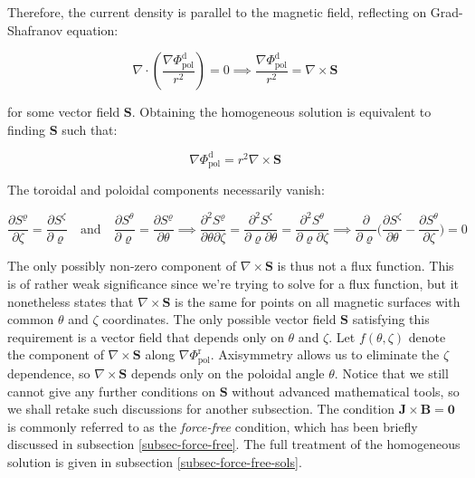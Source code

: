 Therefore, the current density is parallel to the magnetic field, reflecting on Grad-Shafranov equation:

\begin{equation}
    \nabla\cdot\left(\frac{\nabla\Phi_\text{pol}^\mathrm{d}}{r^2}\right)=0\implies\frac{\nabla\Phi_\text{pol}^\mathrm{d}}{r^2}=\nabla\times\mathbf{S}
\end{equation}

for some vector field $\mathbf{S}$. Obtaining the homogeneous solution is equivalent to finding $\mathbf{S}$ such that:

\begin{equation}
    \nabla\Phi_\text{pol}^\mathrm{d}=r^2\nabla\times\mathbf{S}
\end{equation}

The toroidal and poloidal components necessarily vanish:

\begin{equation}
    \frac{\partial S^\varrho}{\partial\zeta}=\frac{\partial S^\zeta}{\partial\varrho}\quad\text{and}\quad\frac{\partial S^\theta}{\partial\varrho}=\frac{\partial S^\varrho}{\partial\theta}\implies\frac{\partial^2S^\varrho}{\partial\theta\partial\zeta}=\frac{\partial^2S^\zeta}{\partial\varrho\partial\theta}=\frac{\partial^2S^\theta}{\partial\varrho\partial\zeta}\implies\frac{\partial}{\partial\varrho}\bigg(\frac{\partial S^\zeta}{\partial\theta}-\frac{\partial S^\theta}{\partial\zeta}\bigg)=0
\end{equation}

The only possibly non-zero component of $\nabla\times\mathbf{S}$ is thus not a flux function. This is of rather weak significance since we're trying to solve for a flux function, but it nonetheless states that $\nabla\times\mathbf{S}$ is the same for points on all magnetic surfaces with common $\theta$ and $\zeta$ coordinates. The only possible vector field $\mathbf{S}$ satisfying this requirement is a vector field that depends only on $\theta$ and $\zeta$. Let $f(\theta,\zeta)$ denote the component of $\nabla\times\mathbf{S}$ along $\nabla\Phi_\text{pol}^\text{r}$. Axisymmetry allows us to eliminate the $\zeta$ dependence, so $\nabla\times\mathbf{S}$ depends only on the poloidal angle $\theta$. Notice that we still cannot give any further conditions on $\mathbf{S}$ without advanced mathematical tools, so we shall retake such discussions for another subsection. The condition $\mathbf{J}\times\mathbf{B}=\mathbf{0}$ is commonly referred to as the \textit{force-free} condition, which has been briefly discussed in subsection \ref{subsec-force-free}. The full treatment of the homogeneous solution is given in subsection \ref{subsec-force-free-sols}.


